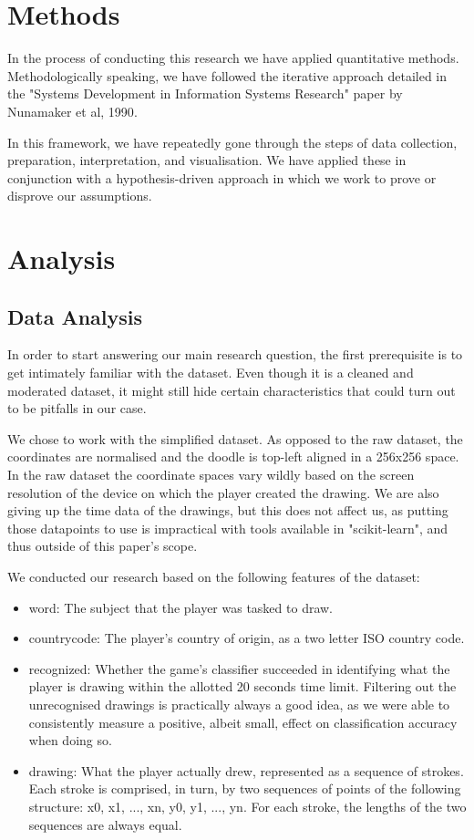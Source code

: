 \documentclass[a4paper, twocolumn]{article}
\begin{document}
\section{Methods\label{sec:Methods}}
In the process of conducting this research we have applied quantitative methods. Methodologically speaking, we have followed the iterative approach detailed in the "Systems Development in Information Systems Research" paper by Nunamaker et al, 1990\cite{nunamaker1990systems}.

In this framework, we have repeatedly gone through the steps of data collection, preparation, interpretation, and visualisation. We have applied these in conjunction with a hypothesis-driven approach in which we work to prove or disprove our assumptions.

\section{Analysis\label{sec:Analysis}}

\subsection{Data Analysis\label{sec:Data Analysis}}
In order to start answering our main research question, the first prerequisite is to get intimately familiar with the dataset. Even though it is a cleaned and moderated dataset, it might still hide certain characteristics that could turn out to be pitfalls in our case.

We chose to work with the simplified dataset. As opposed to the raw dataset, the coordinates are normalised and the doodle is top-left aligned in a 256x256 space. In the raw dataset the coordinate spaces vary wildly based on the screen resolution of the device on which the player created the drawing. We are also giving up the time data of the drawings, but this does not affect us, as putting those datapoints to use is impractical with tools available in "scikit-learn", and thus outside of this paper's scope.

We conducted our research based on the following features of the dataset:
    \begin{itemize}
        \item word: The subject that the player was tasked to draw.
        \item countrycode: The player's country of origin, as a two letter ISO country code.
        \item recognized: Whether the game's classifier succeeded in identifying what the player is drawing within the allotted 20 seconds time limit. Filtering out the unrecognised drawings is practically always a good idea, as we were able to consistently measure a positive, albeit small, effect on classification accuracy when doing so.
        \item drawing: What the player actually drew, represented as a sequence of strokes. Each stroke is comprised, in turn, by two sequences of points of the following structure: \lbrack{}\lbrack{}x0, x1, ..., xn\rbrack{}, \lbrack{}y0, y1, ..., yn\rbrack{}\rbrack{}. For each stroke, the lengths of the two sequences are always equal.
    \end{itemize}
\end{document}
